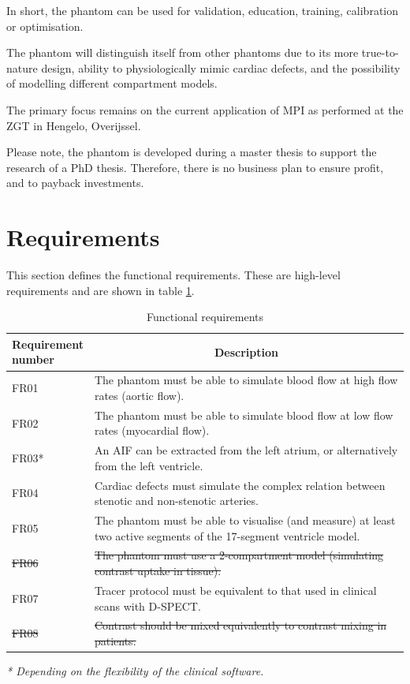 In short, the phantom can be used for validation, education, training, calibration or optimisation. 

The phantom will distinguish itself from other phantoms due to its more true-to-nature design, ability to physiologically mimic cardiac defects, and the possibility of modelling different compartment models.

The primary focus remains on the current application of \ac{MPI} as performed at the ZGT in Hengelo, Overijssel.

Please note, the phantom is developed during a master thesis to support the research of a PhD thesis. Therefore, there is no business plan to ensure profit, and to payback investments.

\section{Requirements}
This section defines the functional requirements. These are high-level requirements and are shown in table \ref{tab:funcreq}.

\begin{table}[h]
\caption{Functional requirements}
\label{tab:funcreq}
\begin{tabular}{l|p{120mm}|}
	\makecell[l]{Requirement \\ number} & \multicolumn{1}{c}{Description}\\
	\hline
	FR01 & The phantom must be able to simulate blood flow at high flow rates (aortic flow). \\ 
	\rowcolor{Gray}
	FR02 & The phantom must be able to simulate blood flow at low flow rates (myocardial flow). \\
	FR03* & An \ac{AIF} can be extracted from the left atrium, or alternatively from the left ventricle. \\
	\rowcolor{Gray}
	FR04 & Cardiac defects must simulate the complex relation between stenotic and non-stenotic arteries. \\
	FR05 & The phantom must be able to visualise (and measure) at least two active segments of the 17-segment ventricle model. \\
	\rowcolor{Gray}
	\sout{FR06} & \sout{The phantom must use a 2-compartment model (simulating contrast uptake in tissue).} \\
	FR07 & Tracer protocol must be equivalent to that used in clinical scans with D-SPECT. \\
	\rowcolor{Gray}
	\sout{FR08} & \sout{Contrast should be mixed equivalently to contrast mixing in patients.} \\
	\cline{2-2}
\end{tabular}
\raggedright
\textit{* Depending on the flexibility of the clinical software.}
\end{table}

